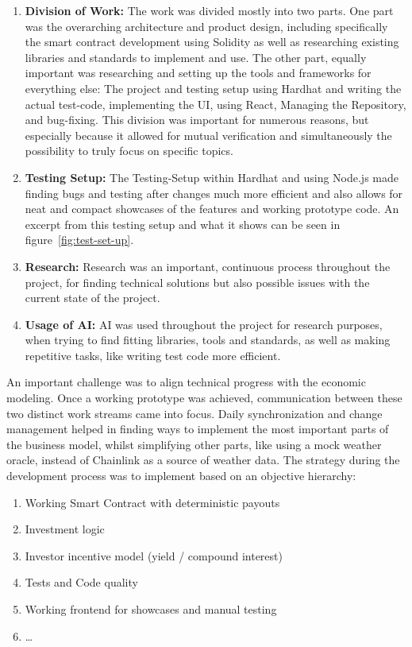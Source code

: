 \documentclass[11pt,a4paper]{article}
\begin{document}
    \begin{enumerate}[1]
        \item \textbf{Division of Work:} The work was divided mostly into two parts.
        One part was the overarching architecture and product design, including specifically the smart contract development using Solidity as well as researching existing libraries and standards to implement and use.
        The other part, equally important was researching and setting up the tools and frameworks for everything else: The project and testing setup using Hardhat and writing the actual test-code, implementing the UI, using React, Managing the Repository, and bug-fixing.
        This division was important for numerous reasons, but especially because it allowed for mutual verification and simultaneously the possibility to truly focus on specific topics.
        \item \textbf{Testing Setup:} The Testing-Setup within Hardhat and using Node.js made finding bugs and testing after changes much more efficient and also allows for neat and compact showcases of the features and working prototype code.
        An excerpt from this testing setup and what it shows can be seen in figure~\ref{fig:test-set-up}.
        \item \textbf{Research:} Research was an important, continuous process throughout the project, for finding technical solutions but also possible issues with the current state of the project.
        \item \textbf{Usage of AI:} AI was used throughout the project for research purposes, when trying to find fitting libraries, tools and standards, as well as making repetitive tasks, like writing test code more efficient.
    \end{enumerate}

    An important challenge was to align technical progress with the economic modeling.
    Once a working prototype was achieved, communication between these two distinct work streams came into focus.
    Daily synchronization and change management helped in finding ways to implement the most important parts of the business model, whilst simplifying other parts, like using a mock weather oracle, instead of Chainlink as a source of weather data.
    The strategy during the development process was to implement based on an objective hierarchy:

    \begin{enumerate}[1]
        \item Working Smart Contract with deterministic payouts
        \item Investment logic
        \item Investor incentive model (yield / compound interest)
        \item Tests and Code quality
        \item Working frontend for showcases and manual testing
        \item \ldots
    \end{enumerate}
\end{document}
